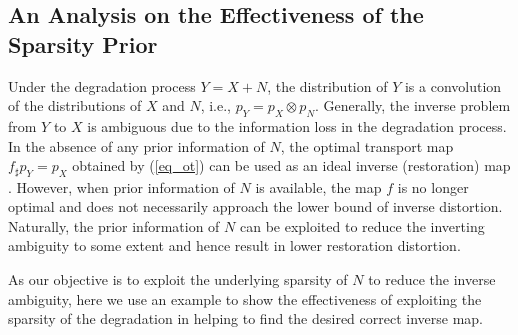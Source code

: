 \documentclass[10pt,journal,compsoc]{IEEEtran}
\begin{document}
\subsection{An Analysis on the Effectiveness of the Sparsity Prior}

Under the degradation process $Y=X+N$, the distribution of $Y$
is a convolution of the distributions of $X$ and $N$,
i.e., $p_Y=p_X\otimes p_N$. Generally, the inverse problem
from $Y$ to $X$ is ambiguous due to the information loss
in the degradation process. In the absence of any prior
information of $N$, the optimal transport map $f_{\sharp}p_Y=p_X$ obtained
by (\ref{eq_ot}) can be used as an ideal inverse (restoration) map \cite{wang2022optimal}.
However, when prior information of $N$ is available, the map $f$ is
no longer optimal and does not necessarily approach the lower bound
of inverse distortion. Naturally, the prior information of $N$ can be
exploited to reduce the inverting ambiguity to some extent and hence
result in lower restoration distortion.

As our objective is to exploit the underlying sparsity of $N$ to reduce
the inverse ambiguity, here we use an example to show the effectiveness
of exploiting the sparsity of the degradation in helping to find the
desired correct inverse map.
\end{document}
